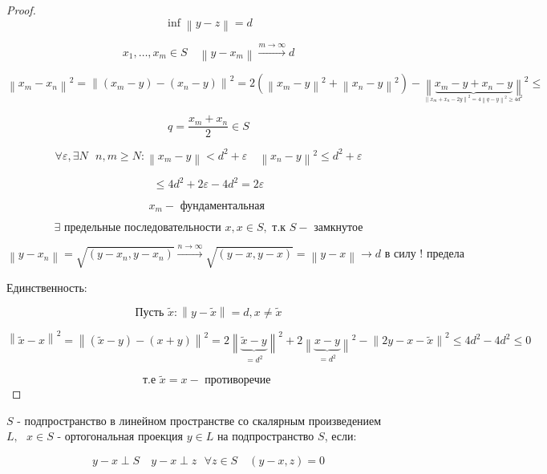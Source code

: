 \documentclass[12pt, a4paper]{report}
\begin{document}
\begin{proof}

    \[ \inf \left\lVert y -z  \right\rVert = d  \]  

    \[ x_1, \ldots, x_m \in  S \quad  \left\lVert  y - x_m       \right\rVert \xrightarrow{m \to  \infty } d   \] 

    \[ \left\lVert x_m - x_n         \right\rVert ^2 = \left\lVert (x_m - y ) - (x_n - y )  \right\rVert  ^2 = 2( \left\lVert  x_m - y   \right\rVert ^2 + \left\lVert  x_n - y      \right\rVert ^2 ) - \underset{_{\left\lVert x_m+ x_n - 2y  \right\rVert ^2 = 4 \left\lVert q - y  \right\rVert ^2 \geq 4 d ^2  }}{\left\lVert \underbrace{x_m - y + x_n - y }  \right\rVert }^2 \boxed{\le } \] 

    \[ q = \frac{x_m+ x_n }{2 } \in  S   \] 

    \[  \forall  \varepsilon , \exists  N \text{ }  n, m \geq  N :  \left\lVert x_m - y      \right\rVert  < d ^2 + \varepsilon \quad  \left\lVert  x_n - y  \right\rVert  ^2 \le  d ^2 + \varepsilon \] 

    \[ \boxed{\le  } 4 d ^2 + 2 \varepsilon - 4 d ^2 = 2 \varepsilon   \] 

    \[ x_m - \text{ фундаментальная }  \] 

    \[ \exists  \text{ предельные последовательности }  x , x \in  S , \text{ т.к }  S - \text{ замкнутое}  \] 

    \[ \left\lVert  y - x_n      \right\rVert = \sqrt{(y - x_n , y - x_n )} \xrightarrow{n \to  \infty  } \sqrt{(y - x, y -x )} = \left\lVert y -x  \right\rVert \to  d \text{ в силу ! предела}    \] 

    Единственность: 

    \[ \text{Пусть } \tilde{x }: \left\lVert  y - \tilde{ x }\right\rVert = d , x \neq  \tilde{x } \] 

    \[ \left\lVert  \tilde{ x } - x      \right\rVert ^2 = \left\lVert  (\tilde{x }- y ) - ( x + y ) \right\rVert ^2 = 2\underset{= d ^2 }{\left\lVert \underbrace{\tilde{x }  - y}  \right\rVert}  ^2 +2\underset{= d ^2 }{\left\lVert \underbrace{x  - y}  \right\rVert} ^2 - \left\lVert 2 y - x - \tilde{x } \right\rVert ^2 \le 4 d ^2 - 4 d ^2 \le  0 \] 

    \[ \text{т.е } \tilde{x } = x - \text{ противоречие }  \] 

\end{proof}

\begin{definition}
    \( S  \)  - подпространство в линейном пространстве со скалярным произведением \( L, \text{ } x \in  S   \)  - ортогональная проекция \(  y \in  L   \)  на подпространство \( S  \), если: 

    \[ y- x \perp  S \quad  y -x \perp  z \text{ }  \forall  z \in  S \quad  ( y - x , z ) = 0  \] 

\end{definition}
\end{document}
